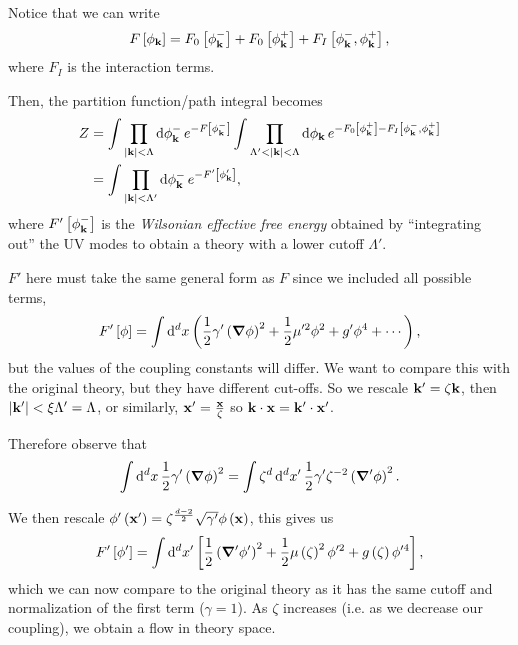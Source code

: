 Notice that we can write
\begin{align}
    F\left[ \phi_{\vb{k}} \right] = F_0 \left[ \phi_{\vb{k}}^{-} \right] + F_{0} \left[ \phi_{\vb{k}}^{+} \right]  + F_{I}\left[ \phi_{\vb{k}}^{-}, \phi_{\vb{k}}^{+} \right] 
,\end{align}
where $F_{I}$ is the interaction terms.

Then, the partition function/path integral becomes
\begin{align}
    Z &= \int \prod_{\left| \vb{k} \right| < \Lambda} \dd{\phi_{\vb{k}}^{-}} e^{- F \left[ \phi_{\vb{k}}^{-} \right] } \int \prod_{\Lambda' < \left| \vb{k} \right| < \Lambda} \dd{\phi_{\vb{k}}} e^{- F_0 \left[ \phi_{\vb{k}}^{+} \right] - F_I \left[ \phi_{\vb{k}}^{-}, \phi_{\vb{k}}^{+} \right]  } \\
    &= \int \prod_{\left| \vb{k} \right| < \Lambda'} \dd{\phi^{-}_{\vb{k}}} e^{-F' \left[ \phi_{\vb{k}}' \right]} 
,\end{align}
where $F' \left[ \phi_{\vb{k}}^{-} \right] $ is the \textit{Wilsonian effective free energy} obtained by ``integrating out'' the UV modes to obtain a theory with a lower cutoff $\Lambda'$.

$F'$ here must take the same general form as $F$ since we included all possible terms,
\begin{align}
    F' \left[ \phi \right] = \int \dd{^{d}x} \left( \frac{1}{2} \gamma' \left( \grad \phi \right)^2 + \frac{1}{2} \mu'^2 \phi^2 + g' \phi^{4} + \cdots \right) 
,\end{align}
but the values of the coupling constants will differ. We want to compare this with the original theory, but they have different cut-offs. So we rescale $\vb{k}' = \zeta \vb{k}$, then $\left| \vb{k}' \right| < \xi \Lambda' = \Lambda$, or similarly, $\vb{x}' = \frac{\vb{x}}{\zeta}$ so $\vb{k} \cdot \vb{x} = \vb{k}' \cdot \vb{x}'$.

Therefore observe that
\begin{align}
    \int \dd{^{d}x} \frac{1}{2} \gamma' \left( \grad \phi \right)^2 = \int \zeta^{d} \dd{^{d}x'} \frac{1}{2} \gamma' \zeta^{-2} \left( \grad' \phi \right)^2
.\end{align}

We then rescale $\phi' \left( \vb{x}' \right) = \zeta^{\frac{d-2}{2}} \sqrt{\gamma'}  \phi \left( \vb{x} \right)$, this gives us
\begin{align}
    F' \left[ \phi' \right] = \int \dd{^{d}x'} \left[ \frac{1}{2} \left( \grad' \phi' \right)^2 + \frac{1}{2}\mu \left( \zeta \right)^2 \phi'^2 + g \left( \zeta \right) \phi'^{4} \right] 
,\end{align}
which we can now compare to the original theory as it has the same cutoff and normalization of the first term ($\gamma = 1$). As $\zeta$ increases (i.e. as we decrease our coupling), we obtain a flow in theory space.

